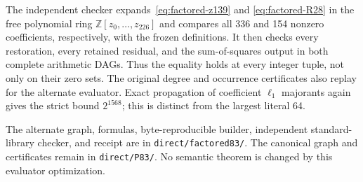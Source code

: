 The independent checker expands~\eqref{eq:factored-z139} and
\eqref{eq:factored-R28} in the free polynomial ring
$\mathbb Z[z_0,\ldots,z_{226}]$ and compares all 336 and 154 nonzero
coefficients, respectively, with the frozen definitions. It then checks
every restoration, every retained residual, and the sum-of-squares output
in both complete arithmetic DAGs. Thus the equality holds at every integer
tuple, not only on their zero sets. The original degree and occurrence
certificates also replay for the alternate evaluator. Exact propagation
of coefficient $\ell_1$ majorants again gives the strict bound $2^{1568}$;
this is distinct from the largest literal 64.

The alternate graph, formulas, byte-reproducible builder, independent
standard-library checker, and receipt are in
\texttt{direct/factored83/}. The canonical graph and certificates remain
in \texttt{direct/P83/}. No semantic theorem is changed by this evaluator
optimization.
